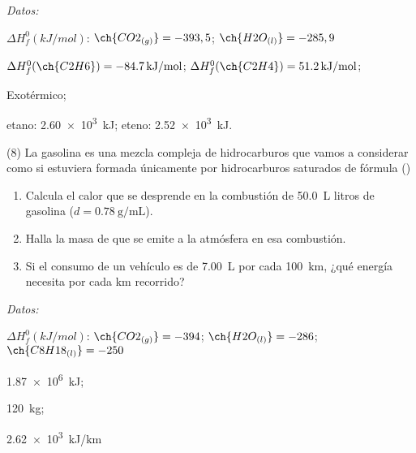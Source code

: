 \documentclass[10pt]{article}
\newenvironment{gexdatos}{
      \vspace{2pt}\noindent\textit{Datos: }
    }{\vspace{5pt}}
\begin{document}
\begin{multicols}{2}
\begin{exercise}[
    tags    = {},
    topics  = {química, termodinámica, termoquímica},
    source  = {FQ 1B MGH 2016, p179, e7},
  ]
  \begin{gexdatos}
    \( \Delta H^0_f (\si{kJ/mol}) \): \( \ch{CO2_{(g)}} = -393,5 \); \( \ch{H2O_{(l)}} = -285,9 \)
  \end{gexdatos}
\end{exercise}

\begin{solution}
  \begin{enumerate*}
    \item \( \Delta H^0_f (\ch{C2H6})= \SI{-84,7}{kJ/mol} \); \( \Delta H^0_f (\ch{C2H4}) = \SI{51.2}{kJ/mol} \); \item Exotérmico; \item etano: \SI{2.60e3}{kJ}; eteno: \SI{2.52e3}{kJ}.
  \end{enumerate*}
\end{solution}




\begin{exercise}[
    tags    = {},
    topics  = {química, termodinámica, termoquímica},
    source  = {FQ 1B MGH 2016, p179, e8},
  ]
  (8) La gasolina es una mezcla compleja de hidrocarburos que
  vamos a considerar como si estuviera formada únicamente
  por hidrocarburos saturados de fórmula ()
  \begin{enumerate}
    \item Calcula el calor que se desprende en la combustión de
    \SI{50.0}{\liter} litros de gasolina (\( d = \SI{0.78}{\gram\per\milli\liter} \)).
    \item Halla la masa de  que se emite a la atmósfera en esa
    combustión.
    \item Si el consumo de un vehículo es de \SI{7.00}{\liter} por cada
    \SI{100}{km}, ¿qué energía necesita por cada \si{km} recorrido?
  \end{enumerate}

  \begin{gexdatos}
    \( \Delta H^0_f (\si{kJ/mol}) \): \( \ch{CO2_{(g)}} = -394 \); \( \ch{H2O_{(l)}} = -286 \); \( \ch{C8H18_{(l)}} = -250 \)
  \end{gexdatos}
\end{exercise}

\begin{solution}
  \begin{enumerate*}
    \item \SI{1.87e6}{kJ}; \item \SI{120}{\kilo\gram}; \item \SI{2.62e3}{kJ/km}
  \end{enumerate*}
\end{solution}





\end{multicols}
\end{document}

